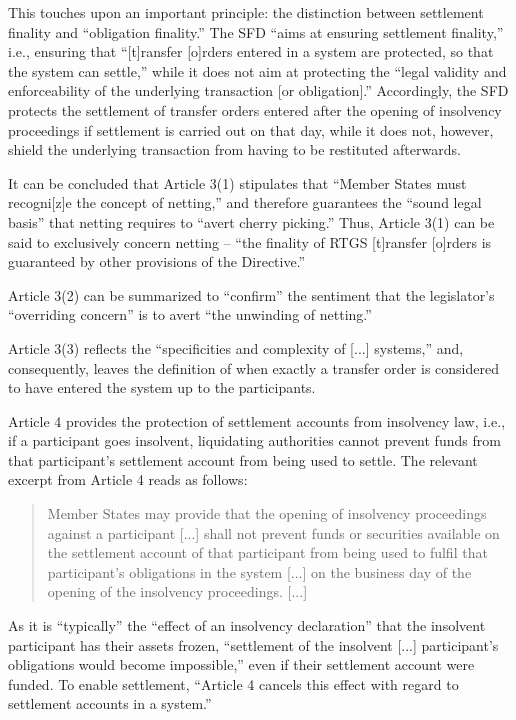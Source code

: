 This touches upon an important principle: the distinction between settlement finality and ``obligation finality.'' \autocite[48]{vereecken2003}
The SFD ``aims at ensuring settlement finality,'' i.e., ensuring that ``[t]ransfer [o]rders entered in a system are protected, so that the system can settle,'' while it does not aim at protecting the ``legal validity and enforceability of the underlying transaction [or obligation].'' \autocite[48]{vereecken2003}
Accordingly, the SFD protects the settlement of transfer orders entered after the opening of insolvency proceedings if settlement is carried out on that day, while it does not, however, shield the underlying transaction from having to be restituted afterwards.

It can be concluded that Article 3(1) stipulates that ``Member States must recogni[z]e the concept of netting,'' and therefore guarantees the ``sound legal basis'' that netting requires to ``avert cherry picking.'' \autocite[45]{vereecken2003}
Thus, Article 3(1) can be said to exclusively concern netting -- ``the finality of RTGS [t]ransfer [o]rders is guaranteed by other provisions of the Directive.'' \autocite[45]{vereecken2003}

Article 3(2) can be summarized to ``confirm'' the sentiment that the legislator's ``overriding concern'' is to avert ``the unwinding of netting.'' \autocite[48]{vereecken2003}

Article 3(3) reflects the ``specificities and complexity of [...] systems,'' and, consequently, leaves the definition of when exactly a transfer order is considered to have entered the system up to the participants. \autocite[50]{vereecken2003}

Article 4 provides the protection of settlement accounts from insolvency law, i.e., if a participant goes insolvent, liquidating authorities cannot prevent funds from that participant's settlement account from being used to settle.
The relevant excerpt from Article 4 reads as follows: \autocite{eu1998sfd}

\begin{quote}
	Member States may provide that the opening of insolvency proceedings against a participant [...] shall not prevent funds or securities available on the settlement account of that participant from being used to fulfil that participant's obligations in the system [...] on the business day of the opening of the insolvency proceedings. [...]
\end{quote}

As it is ``typically'' the ``effect of an insolvency declaration'' that the insolvent participant has their assets frozen, ``settlement of the insolvent [...] participant's obligations would become impossible,'' even if their settlement account were funded. \autocite[51]{vereecken2003}
To enable settlement, ``Article 4 cancels this effect with regard to settlement accounts in a system.'' \autocite[51]{vereecken2003}

